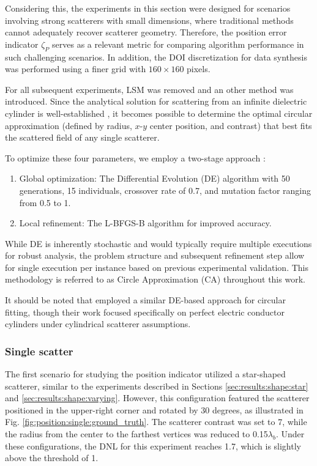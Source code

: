 \documentclass{ieeeaccess}
\begin{document}
        Considering this, the experiments in this section were designed for scenarios involving strong scatterers with small dimensions, where traditional methods cannot adequately recover scatterer geometry. Therefore, the position error indicator $\zeta_P$ serves as a relevant metric for comparing algorithm performance in such challenging scenarios. In addition, the DOI discretization for data synthesis was performed using a finer grid with $160 \times 160$ pixels.

        For all subsequent experiments, LSM was removed and an other method was introduced. Since the analytical solution for scattering from an infinite dielectric cylinder is well-established \cite{harrington2001time}, it becomes possible to determine the optimal circular approximation (defined by radius, $x$-$y$ center position, and contrast) that best fits the scattered field of any single scatterer.

        To optimize these four parameters, we employ a two-stage approach \cite{virtanen2020SciPy}:
        \begin{enumerate}
            \item Global optimization: The Differential Evolution (DE) algorithm \cite{storn1997differential} with 50 generations, 15 individuals, crossover rate of 0.7, and mutation factor ranging from 0.5 to 1.
            \item Local refinement: The L-BFGS-B algorithm \cite{zhu1997algorithm} for improved accuracy.
        \end{enumerate}

        While DE is inherently stochastic and would typically require multiple executions for robust analysis, the problem structure and subsequent refinement step allow for single execution per instance based on previous experimental validation. This methodology is referred to as Circle Approximation (CA) throughout this work.

        It should be noted that \cite{michalski2000electromagnetic} employed a similar DE-based approach for circular fitting, though their work focused specifically on perfect electric conductor cylinders under cylindrical scatterer assumptions.

        \subsubsection{Single scatter}\label{sec:results:position:single}

            The first scenario for studying the position indicator utilized a star-shaped scatterer, similar to the experiments described in Sections \ref{sec:results:shape:star} and \ref{sec:results:shape:varying}. However, this configuration featured the scatterer positioned in the upper-right corner and rotated by 30 degrees, as illustrated in Fig. \ref{fig:position:single:ground_truth}. The scatterer contrast was set to 7, while the radius from the center to the farthest vertices was reduced to 0.15$\lambda_b$. Under these configurations, the DNL for this experiment reaches 1.7, which is slightly above the threshold of 1.
\end{document}
